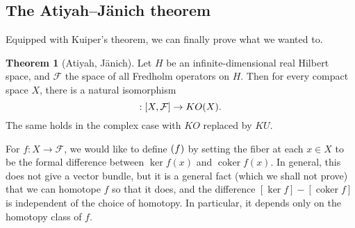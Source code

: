 \documentclass{shortart}
\theoremstyle{definition}
\newtheorem*{thm}{Theorem}
\let\index\relax
\DeclareMathOperator{\index}{idx}
\DeclareMathOperator{\coker}{coker}
\begin{document}
\subsection{The Atiyah--J\"anich theorem}
Equipped with Kuiper's theorem, we can finally prove what we wanted to.
\begin{thm}[Atiyah, J\"anich]
  Let $H$ be an infinite-dimensional real Hilbert space, and $\mathcal{F}$ the space of all Fredholm operators on $H$. Then for every compact space $X$, there is a natural isomorphism
  \[
    \index: [X, \mathcal{F}] \to KO(X).
  \]
  The same holds in the complex case with $KO$ replaced by $KU$.
\end{thm}

For $f: X \to \mathcal{F}$, we would like to define $\index(f)$ by setting the fiber at each $x \in X$ to be the formal difference between $\ker f(x)$ and $\coker f(x)$. In general, this does not give a vector bundle, but it is a general fact (which we shall not prove) that we can homotope $f$ so that it does, and the difference $[\ker f] - [\coker f]$ is independent of the choice of homotopy. In particular, it depends only on the homotopy class of $f$.
\end{document}
